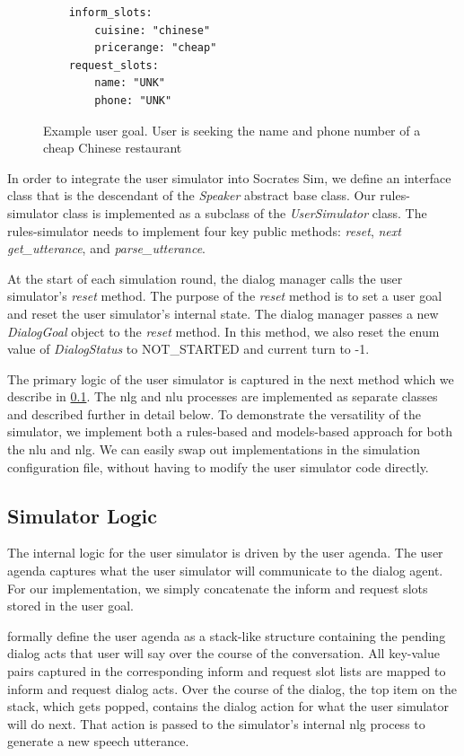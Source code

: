 \begin{figure}[h!]
	\label{fig:ex_user_goal}
	\begin{lstlisting}
	inform_slots:
		cuisine: "chinese"
		pricerange: "cheap"
	request_slots:
		name: "UNK"
		phone: "UNK"		
	\end{lstlisting}
	\caption{ Example user goal. User is seeking the name and phone number of a cheap Chinese restaurant}
	
\end{figure}

\pagebreak

In order to integrate the user simulator into Socrates Sim, we define an interface class that is the descendant of the \textit{Speaker} abstract base class. Our rules-simulator class is implemented as a subclass of the \textit{UserSimulator} class. The rules-simulator needs to implement four key public methods:  \textit{reset}, \textit{next} \textit{get\_utterance}, and \textit{parse\_utterance}. 

At the start of each simulation round, the dialog manager calls the user simulator's \textit{reset} method. The purpose of the \textit{reset} method is to set a user goal and reset the user simulator's internal state. The dialog manager passes a new \textit{DialogGoal} object to the \textit{reset} method. In this method, we also reset the enum value of \textit{DialogStatus} to NOT\_STARTED and current turn to -1.

The primary logic of the user simulator is captured in the next method which we describe in \ref{sssec:logic}. The nlg and nlu processes are implemented as separate classes and described further in detail below. To demonstrate the versatility of the simulator, we implement both a rules-based and models-based approach for both the nlu and nlg. We can easily swap out implementations in the simulation configuration file, without having to modify the user simulator code directly.

\subsection{Simulator Logic}
\label{sssec:logic}

The internal logic for the user simulator is driven by the user agenda. The user agenda captures what the user simulator will communicate to the dialog agent. For our implementation, we simply concatenate the inform and request slots stored in the user goal. 

\cite{Schatzmann2009TheHA} formally define the user agenda as a stack-like structure containing the pending dialog acts that user will say over the course of the conversation. All key-value pairs captured in the corresponding inform and request slot lists are mapped to inform and request dialog acts. Over the course of the dialog, the top item on the stack, which gets popped, contains the dialog action for what the user simulator will do next. That action is passed to the simulator's internal nlg process to generate a new speech utterance. 

